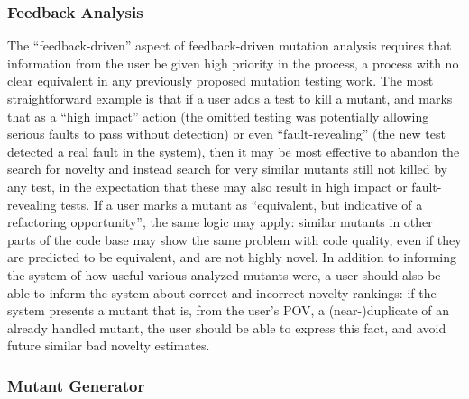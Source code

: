 \subsubsection{Feedback Analysis}
\label{sec:feedbackplan}

The ``feedback-driven'' aspect of feedback-driven mutation analysis
requires that information from the user be given high priority in the
process, a process with no clear equivalent in any previously proposed
mutation testing work.  The most straightforward example is that if a
user adds a test to kill a mutant, and marks that as a ``high impact''
action (the omitted testing was potentially allowing serious faults to
pass without detection) or even ``fault-revealing'' (the new test
detected a real fault in the system), then it may be most effective to
abandon the search for novelty and instead search for very similar
mutants still not killed by any test, in the expectation that these
may also result in high impact or fault-revealing tests.  If a user
marks a mutant as ``equivalent, but indicative of a refactoring
opportunity'', the same logic may apply:  similar mutants in other
parts of the code base may show the same problem with code quality,
even if they are predicted to be equivalent, and are not highly
novel.  In addition to informing the system of how useful various
analyzed mutants were, a user should also be able to inform the system
about correct and incorrect novelty rankings:  if the system presents
a mutant that is, from the user's POV, a (near-)duplicate of an
already handled mutant, the user should be able to express this fact,
and avoid future similar bad novelty estimates.

\subsubsection{Mutant Generator}
\label{sec:anylangplan}

